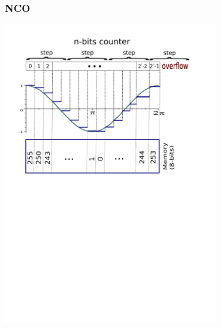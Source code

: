 \documentclass[compress,10pt,aspectratio=169]{beamer}
\begin{document}
\begin{frame}\frametitle{NCO}
\center
\includegraphics[width=0.7\textwidth]{./NCOOO.pdf}
\end{frame}
\end{document}
